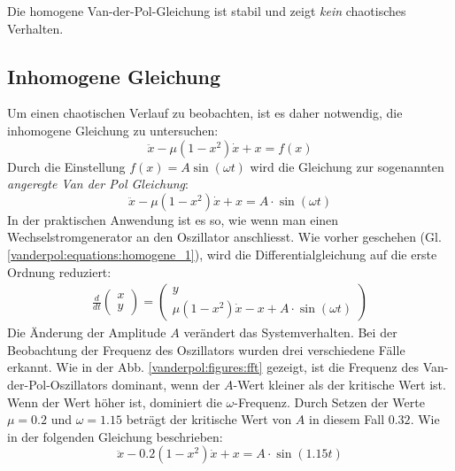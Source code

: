 \noindent Die homogene Van-der-Pol-Gleichung ist stabil und zeigt {\em kein} chaotisches Verhalten.
\subsection{Inhomogene Gleichung}
\label{vanderpol:subsection:inhomogene}
Um einen chaotischen Verlauf zu beobachten, ist es daher notwendig, die inhomogene Gleichung zu untersuchen:
\begin{equation*}
	\ddot{x}-\mu\left(1-x^{2}\right) \dot{x}+x = f(x)
\label{vanderpol:equations:inhomogene_gen}
\end{equation*}
Durch die Einstellung $f(x) = A \sin(\omega t)$ wird die Gleichung zur sogenannten {\em angeregte Van der Pol Gleichung}:
\begin{equation}
	\ddot{x}-\mu\left(1-x^{2}\right) \dot{x}+x = A \cdot \sin(\omega t)
\label{vanderpol:equations:inhomogene_sin}
\end{equation}
In der praktischen Anwendung ist es so, wie wenn man einen Wechselstromgenerator an den Oszillator anschliesst. Wie vorher geschehen (Gl. \ref{vanderpol:equations:homogene_1}), wird die Differentialgleichung auf die erste Ordnung reduziert:
\begin{align}
\frac{d}{dt}\begin{pmatrix}x \\ y\end{pmatrix} = \begin{pmatrix}y \\ \mu \left(1-x^{2}\right)\dot{x}-x+A \cdot \sin(\omega t)\end{pmatrix}
\label{vanderpol:equations:inhomogene_2}
\end{align}
Die Änderung der Amplitude $A$ verändert das Systemverhalten. Bei der Beobachtung der Frequenz des Oszillators wurden drei verschiedene Fälle erkannt. Wie in der Abb. \ref{vanderpol:figures:fft} gezeigt, ist die Frequenz des Van-der-Pol-Oszillators dominant, wenn der $A$-Wert kleiner als der kritische Wert ist. Wenn der Wert höher ist, dominiert die $\omega$-Frequenz. Durch Setzen der Werte $\mu=0.2$ und $\omega=1.15$ beträgt der kritische Wert von $A$ in diesem Fall $0.32$. Wie in der folgenden Gleichung beschrieben:
\begin{equation}
	\ddot{x}-0.2\left(1-x^{2}\right) \dot{x}+x = A \cdot \sin(1.15 t)
	\label{vanderpol:equations:inhomogene_3}
\end{equation}
